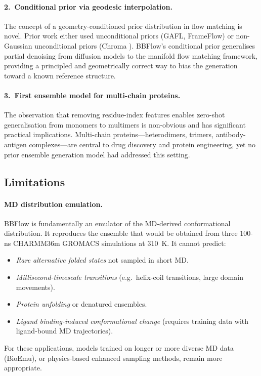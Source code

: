 \documentclass[12pt,a4paper]{article}
\begin{document}
\paragraph{2.\ Conditional prior via geodesic interpolation.}
The concept of a geometry-conditioned prior distribution in flow matching is novel.  Prior
work either used unconditional priors (GAFL, FrameFlow) or non-Gaussian unconditional priors
(Chroma \citep{ingraham2023}).  BBFlow's conditional prior generalises partial denoising from
diffusion models to the manifold flow matching framework, providing a principled and geometrically
correct way to bias the generation toward a known reference structure.

\paragraph{3.\ First ensemble model for multi-chain proteins.}
The observation that removing residue-index features enables zero-shot generalisation from
monomers to multimers is non-obvious and has significant practical implications.  Multi-chain
proteins---heterodimers, trimers, antibody-antigen complexes---are central to drug discovery
and protein engineering, yet no prior ensemble generation model had addressed this setting.

\subsection{Limitations}
\label{sec:limitations}

\paragraph{MD distribution emulation.}
BBFlow is fundamentally an emulator of the MD-derived conformational distribution.  It
reproduces the ensemble that would be obtained from three $100$-ns CHARMM36m GROMACS
simulations at $310$~K.  It cannot predict:
\begin{itemize}
  \item \emph{Rare alternative folded states} not sampled in short MD.
  \item \emph{Millisecond-timescale transitions} (e.g.\ helix-coil transitions, large
    domain movements).
  \item \emph{Protein unfolding} or denatured ensembles.
  \item \emph{Ligand binding-induced conformational change} (requires training data with ligand-bound
    MD trajectories).
\end{itemize}
For these applications, models trained on longer or more diverse MD data (BioEmu), or
physics-based enhanced sampling methods, remain more appropriate.
\end{document}

